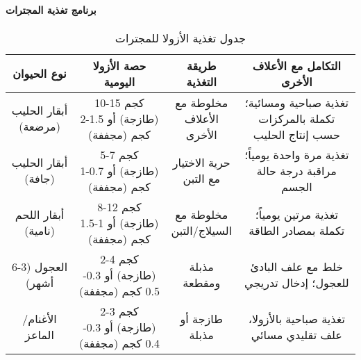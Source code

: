 \paragraph{برنامج تغذية المجترات}
\begin{table}[h]
\centering
\caption{جدول تغذية الأزولا للمجترات}
\label{tab:ruminant_feeding}
\begin{tabular}{|c|c|c|c|}
\hline
\textbf{نوع الحيوان} & \textbf{حصة الأزولا اليومية} & \textbf{طريقة التغذية} & \textbf{التكامل مع الأعلاف الأخرى} \\
\hline
أبقار الحليب (مرضعة) & 10-15 كجم (طازجة) أو 1.5-2 كجم (مجففة) & مخلوطة مع الأعلاف الأخرى & تغذية صباحية ومسائية؛ تكملة بالمركزات حسب إنتاج الحليب \\
\hline
أبقار الحليب (جافة) & 5-7 كجم (طازجة) أو 0.7-1 كجم (مجففة) & حرية الاختيار مع التبن & تغذية مرة واحدة يومياً؛ مراقبة درجة حالة الجسم \\
\hline
أبقار اللحم (نامية) & 8-12 كجم (طازجة) أو 1-1.5 كجم (مجففة) & مخلوطة مع السيلاج/التبن & تغذية مرتين يومياً؛ تكملة بمصادر الطاقة \\
\hline
العجول (3-6 أشهر) & 2-4 كجم (طازجة) أو 0.3-0.5 كجم (مجففة) & مذبلة ومقطعة & خلط مع علف البادئ للعجول؛ إدخال تدريجي \\
\hline
الأغنام/الماعز & 2-3 كجم (طازجة) أو 0.3-0.4 كجم (مجففة) & طازجة أو مذبلة & تغذية صباحية بالأزولا، علف تقليدي مسائي \\
\hline
\end{tabular}
\end{table}

